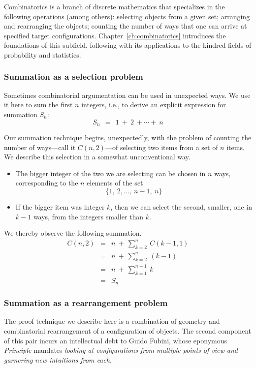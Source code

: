 Combinatorics is a branch of discrete mathematics that specializes in the following operations (among others): selecting objects from a given set; arranging and rearranging the objects; counting the number of ways that one can arrive at specified target configurations.
Chapter~\ref{ch:combinatorics} introduces the foundations of this subfield, following with its applications to the kindred fields of probability and statistics.

\subsubsection{Summation as a selection problem}
\label{sec:comb-sum-of-first-n}

Sometimes combinatorial argumentation can be used in unexpected ways.  We use it here to sum the first $n$ integers, i.e., to derive an explicit expression for summation $S_n$:
\[ S_n \ \ = \ \ 1 \ + \ 2 \ + \cdots + \ n \]

Our summation technique begins, unexpectedly, with the problem of counting the number of ways---call it $C(n,2)$---of selecting two items from a set of $n$ items.  We describe this selection in a somewhat unconventional way.
\begin{itemize}
\item
The bigger integer of the two we are selecting can be chosen in $n$ ways, corresponding to the $n$ elements of the set
\[ \{ 1, \ 2, \ldots, \ n-1, \ n \} \]
\item
If the bigger item was integer $k$, then we can select the second, smaller, one in $k-1$ ways, from the integers smaller than $k$.
\end{itemize}
We thereby observe the following summation.
\begin{eqnarray*}
C(n,2) & = & n \ + \ \sum_{k=2}^n \ C(k-1,1) \\
       & = & n \ + \ \sum_{k=2}^n \ (k-1) \\
       & = & n \ + \ \sum_{k=1}^{n-1} \ k \\
       & = & S_n
\end{eqnarray*}

\subsubsection{Summation as a rearrangement problem}
\label{sec:summation-via-Fubini}

The proof technique we describe here is a combination of geometry and combinatorial rearrangement of a configuration of objects.  The second component of this pair incurs an intellectual debt to Guido Fubini, whose eponymous {\em Principle} mandates {\em looking at configurations from multiple points of view and garnering new intuitions from each}.
 

